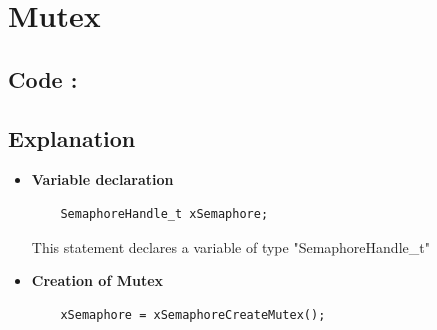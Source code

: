 \documentclass[11pt,a4paper]{book}
\begin{document}
\section{Mutex}

\subsection{Code : }
	
\newpage

\subsection{Explanation}
\begin{itemize}
	\item \textbf{Variable declaration}	
	
	\begin{lstlisting}
	SemaphoreHandle_t xSemaphore;
	\end{lstlisting}
	
	This statement declares a variable of type "SemaphoreHandle\_t"
	
	\item \textbf{Creation of Mutex}
	
	\begin{lstlisting}
	xSemaphore = xSemaphoreCreateMutex();
	\end{lstlisting}
	

\end{itemize}
\end{document}
